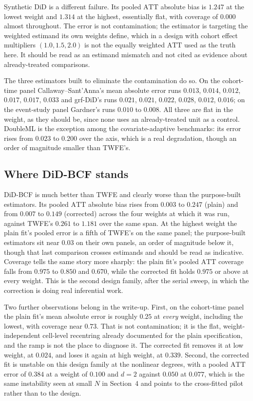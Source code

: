 \documentclass[11pt]{article}
\newcommand{\att}{\mathrm{ATT}}
\begin{document}
Synthetic DiD is a different failure. Its pooled $\att$ absolute bias is
$1.247$ at the lowest weight and $1.314$ at the highest, essentially flat, with
coverage of $0.000$ almost throughout. The error is not contamination; the
estimator is targeting the weighted estimand its own weights define, which in
a design with cohort effect multipliers $(1.0,1.5,2.0)$ is not the equally
weighted $\att$ used as the truth here. It should be read as an estimand
mismatch and not cited as evidence about already-treated comparisons.

The three estimators built to eliminate the contamination do so. On the
cohort-time panel Callaway--Sant'Anna's mean absolute error runs $0.013$,
$0.014$, $0.012$, $0.017$, $0.017$, $0.033$ and grf-DiD's runs $0.021$,
$0.021$, $0.022$, $0.028$, $0.012$, $0.016$; on the event-study panel
Gardner's runs $0.010$ to $0.008$. All three are flat in the weight, as they
should be, since none uses an already-treated unit as a control. DoubleML is
the exception among the covariate-adaptive benchmarks: its error rises from
$0.023$ to $0.200$ over the axis, which is a real degradation, though an order
of magnitude smaller than TWFE's.

\subsection{Where DiD-BCF stands}

DiD-BCF is much better than TWFE and clearly worse than the purpose-built
estimators. Its pooled $\att$ absolute bias rises from $0.003$ to $0.247$
(plain) and from $0.007$ to $0.149$ (corrected) across the four weights at
which it was run, against TWFE's $0.261$ to $1.181$ over the same span. At the highest weight the plain fit's pooled error is a fifth of TWFE's on
the same panel; the purpose-built estimators sit near $0.03$ on their own
panels, an order of magnitude below it, though that last comparison crosses
estimands and should be read as indicative. Coverage tells the same story more sharply: the
plain fit's pooled $\att$ coverage falls from $0.975$ to $0.850$ and $0.670$,
while the corrected fit holds $0.975$ or above at every weight. This is the
second design family, after the serial sweep, in which the correction is doing
real inferential work.

Two further observations belong in the write-up. First, on the cohort-time
panel the plain fit's mean absolute error is roughly $0.25$ at \emph{every}
weight, including the lowest, with coverage near $0.73$. That is not
contamination; it is the flat, weight-independent cell-level recentring
already documented for the plain specification, and the ramp is not the place
to diagnose it. The corrected fit removes it at low weight, at $0.024$, and
loses it again at high weight, at $0.339$. Second, the corrected fit is
unstable on this design family at the nonlinear degrees, with a pooled $\att$
error of $0.384$ at a weight of $0.100$ and $d=2$ against $0.050$ at $0.077$,
which is the same instability seen at small $N$ in Section~4 and points to the
cross-fitted pilot rather than to the design.
\end{document}
